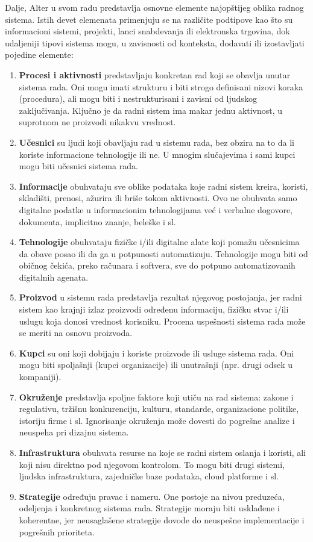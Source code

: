 Dalje, Alter u svom radu predstavlja osnovne elemente najopštijeg oblika radnog sistema. Istih devet elemenata primenjuju se na različite podtipove kao što su informacioni sistemi, projekti, lanci snabdevanja ili elektronska trgovina, dok udaljeniji tipovi sistema mogu, u zavisnosti od konteksta, dodavati ili izostavljati pojedine elemente:
\begin{enumerate}
\item \textbf{Procesi i aktivnosti} predstavljaju konkretan rad koji se obavlja unutar sistema rada. Oni mogu imati strukturu i biti strogo definisani nizovi koraka (procedura), ali mogu biti i nestrukturisani i zavisni od ljudskog zaključivanja. Ključno je da radni sistem ima makar jednu aktivnost, u suprotnom ne proizvodi nikakvu vrednost.
\item \textbf{Učesnici} su ljudi koji obavljaju rad u sistemu rada, bez obzira na to da li koriste informacione tehnologije ili ne. U mnogim slučajevima i sami kupci mogu biti učesnici sistema rada.
\item \textbf{Informacije} obuhvataju sve oblike podataka koje radni sistem kreira, koristi, skladišti, prenosi, ažurira ili briše tokom aktivnosti. Ovo ne obuhvata samo digitalne podatke u informacionim tehnologijama već i verbalne dogovore, dokumenta, implicitno znanje, beleške i sl.
\item \textbf{Tehnologije} obuhvataju fizičke i/ili digitalne alate koji pomažu učesnicima da obave posao ili da ga u potpunosti automatizuju. Tehnologije mogu biti od običnog čekića, preko računara i softvera, sve do potpuno automatizovanih digitalnih agenata.
\item \textbf{Proizvod} u sistemu rada predstavlja rezultat njegovog postojanja, jer radni sistem kao krajnji izlaz proizvodi određenu informaciju, fizičku stvar i/ili uslugu koja donosi vrednost korisniku. Procena uspešnosti sistema rada može se meriti na osnovu proizvoda.
\item \textbf{Kupci} su oni koji dobijaju i koriste proizvode ili usluge sistema rada. Oni mogu biti spoljašnji (kupci organizacije) ili unutrašnji (npr. drugi odsek u kompaniji).
\item \textbf{Okruženje} predstavlja spoljne faktore koji utiču na rad sistema: zakone i regulativu, tržišnu konkurenciju, kulturu, standarde, organizacione politike, istoriju firme i sl. Ignorisanje okruženja može dovesti do pogrešne analize i neuspeha pri dizajnu sistema.
\item \textbf{Infrastruktura} obuhvata resurse na koje se radni sistem oslanja i koristi, ali koji nisu direktno pod njegovom kontrolom. To mogu biti drugi sistemi, ljudska infrastruktura, zajedničke baze podataka, cloud platforme i sl.
\item \textbf{Strategije} određuju pravac i nameru. One postoje na nivou preduzeća, odeljenja i konkretnog sistema rada. Strategije moraju biti usklađene i koherentne, jer neusaglašene strategije dovode do neuspešne implementacije i pogrešnih prioriteta.
\end{enumerate}

